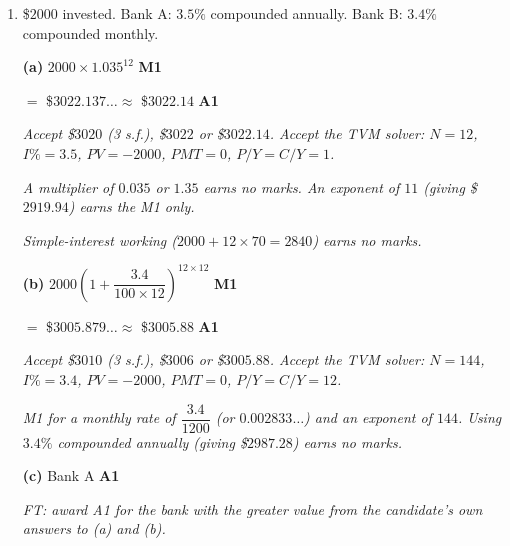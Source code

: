\documentclass[12pt, twoside]{article}
\begin{document}
\begin{enumerate}[itemsep=0.3cm]
\emph{Accept a table search: full marks for showing both adjacent
years and stating $15$. A single row (after $15$ years the value is
\$$3050$, so $15$) still earns full marks, with the feedback note that
the adjacent year $14$ is what justifies ``first''. See
markscheme-spec §18.}

\emph{$14.3$ is not an acceptable final answer --- the answer must be
a whole number of years. Rounding down to $14$ earns the M1 only.}

\emph{FT: award A1 for the smallest whole number of years correctly
obtained from the candidate's own expression in (c).}

\newpage

\item[2.] [Maximum mark: 7]

\$$2000$ invested. Bank A: $3.5\%$ compounded annually. Bank B:
$3.4\%$ compounded monthly.

\medskip

\textbf{(a)} $2000 \times 1.035^{12}$ \hfill \textbf{M1}

$=$ \$$3022.137\ldots \approx$ \$$3022.14$ \hfill \textbf{A1}

\emph{Accept \$$3020$ (3 s.f.), \$$3022$ or \$$3022.14$. Accept the
TVM solver: $N = 12$, $I\% = 3.5$, $PV = -2000$, $PMT = 0$,
$P/Y = C/Y = 1$.}

\emph{A multiplier of $0.035$ or $1.35$ earns no marks. An exponent of
$11$ (giving \$$2919.94$) earns the M1 only.}

\emph{Simple-interest working ($2000 + 12 \times 70 = 2840$) earns no
marks.}

\medskip

\textbf{(b)} $2000\left(1 + \dfrac{3.4}{100 \times 12}\right)^{12
\times 12}$ \hfill \textbf{M1}

$=$ \$$3005.879\ldots \approx$ \$$3005.88$ \hfill \textbf{A1}

\emph{Accept \$$3010$ (3 s.f.), \$$3006$ or \$$3005.88$. Accept the
TVM solver: $N = 144$, $I\% = 3.4$, $PV = -2000$, $PMT = 0$,
$P/Y = C/Y = 12$.}

\emph{M1 for a monthly rate of $\dfrac{3.4}{1200}$ (or $0.002833\ldots$)
and an exponent of $144$. Using $3.4\%$ compounded annually (giving
\$$2987.28$) earns no marks.}

\medskip

\textbf{(c)} Bank A \hfill \textbf{A1}

\emph{FT: award A1 for the bank with the greater value from the
candidate's own answers to (a) and (b).}


\end{enumerate}
\end{document}
